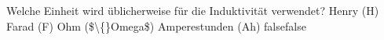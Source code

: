     {Welche Einheit wird üblicherweise für die Induktivität verwendet?}
    {Henry (H)}
    {Farad (F)}
    {Ohm (\$\textbackslash\{\}Omega\$)}
    {Amperestunden (Ah)}
    {false}{false}